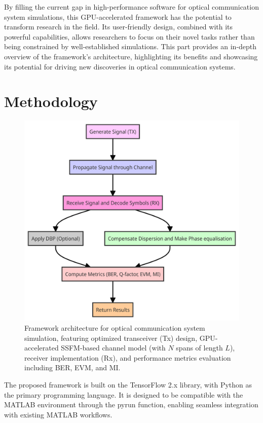 By filling the current gap in high-performance software for optical communication system simulations, this GPU-accelerated framework has the potential to transform research in the field. Its user-friendly design, combined with its powerful capabilities, allows researchers to focus on their novel tasks rather than being constrained by well-established simulations. This part provides an in-depth overview of the framework's architecture, highlighting its benefits and showcasing its potential for driving new discoveries in optical communication systems.


\section{Methodology}

\begin{figure}[t]
   \centering
        \includegraphics[width=0.7\linewidth]{images/hpcom/hpcom_pipe.png}
    \caption{Framework architecture for optical communication system simulation, featuring optimized transceiver (Tx) design, GPU-accelerated SSFM-based channel model (with $N$ spans of length $L$), receiver implementation (Rx), and performance metrics evaluation including BER, EVM, and MI.}
    \label{fig:hpcom_scheme}
\end{figure}

The proposed framework is built on the TensorFlow 2.x library, with Python as the primary programming language. It is designed to be compatible with the MATLAB environment through the \textrm{pyrun} function, enabling seamless integration with existing MATLAB workflows.

